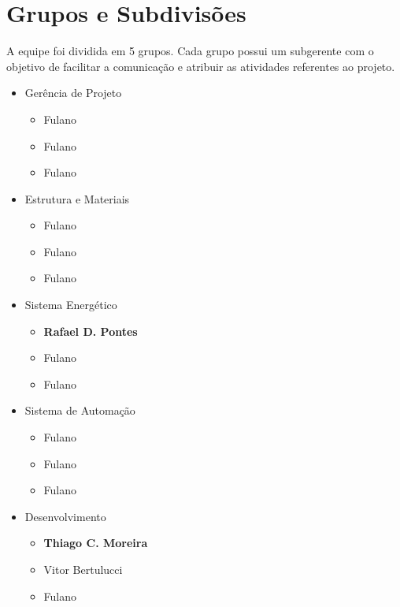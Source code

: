     \section{Grupos e Subdivisões}
        \par A equipe foi dividida em 5 grupos. Cada grupo possui um subgerente com o objetivo de facilitar a comunicação e atribuir as atividades referentes ao projeto.
        \begin{itemize}
            \item Gerência de Projeto
                \begin{itemize}
                    \item Fulano
                    \item Fulano
                    \item Fulano
                \end{itemize}
            \item Estrutura e Materiais
                \begin{itemize}
                    \item Fulano
                    \item Fulano
                    \item Fulano
                \end{itemize}
            \item Sistema Energético
                \begin{itemize}
                    \item \textbf{Rafael D. Pontes}
                    \item Fulano
                    \item Fulano
                \end{itemize}
            \item Sistema de Automação
                \begin{itemize}
                    \item Fulano
                    \item Fulano
                    \item Fulano
                \end{itemize}
            \item Desenvolvimento
                \begin{itemize}
                    \item \textbf{Thiago C. Moreira}
                    \item Vitor Bertulucci
                    \item Fulano
                \end{itemize}
        \end{itemize}
        
        